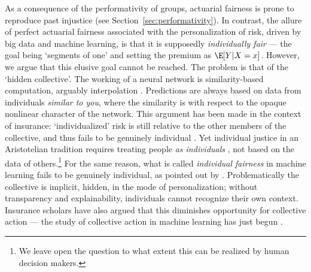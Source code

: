 \documentclass[11pt]{article} %
\begin{document}
As a consequence of the performativity of groups, actuarial fairness is prone to reproduce past injustice (see Section~\ref{sec:performativity}). In contrast, the allure of perfect actuarial fairness associated with the personalization of risk, driven by big data and machine learning, is that it is supposedly \textit{individually fair} --- the goal being `segments of one' and setting the premium as $\E[Y|X=x]$. However, we argue that this elusive goal cannot be reached.
The problem is that of the `hidden collective'. The working of a neural network is similarity-based computation, arguably interpolation \citep{hasson2020direct}. Predictions are always based on data from individuals \textit{similar to you}, where the similarity is with respect to the opaque nonlinear character of the network. This argument has been made in the context of insurance: `individualized' risk is still relative to the other members of the collective, and thus fails to be genuinely individual \citep{tanninen2020contested,prainsack2020shifting}. Yet individual justice in an Aristotelian tradition requires treating people \textit{as individuals} \citep{thiery2006fairness,jorgensen2022algorithms}, not based on the data of others.\footnote{We leave open the question to what extent this can be realized by human decision makers.} For the same reason, what is called \textit{individual fairness} in machine learning fails to be genuinely individual, as pointed out by \citet{binns2020apparent}. Problematically the collective is implicit, hidden, in the mode of personalization; without transparency and explainability, individuals cannot recognize their own context. Insurance scholars have also argued that this diminishes opportunity for collective action \citep{moor2018price,mcfall2018or,krippner2022person} --- the study of collective action in machine learning has just begun \citep{hardt2023algorithmic}.
\end{document}
